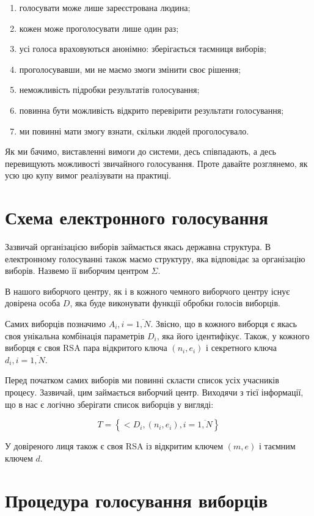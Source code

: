 \documentclass[12pt]{report}
\theoremstyle{plain}
\theoremstyle{definition}
\theoremstyle{remark}
\begin{document}
\begin{enumerate}
    \item голосувати може лише зареєстрована людина;
    \item кожен може проголосувати лише один раз;
    \item усі голоса враховуються анонімно: зберігається таємниця виборів;
    \item проголосувавши, ми не маємо змоги змінити своє рішення;
    \item неможливість підробки результатів голосування;
    \item повинна бути можливість відкрито перевірити результати голосування;
    \item ми повинні мати змогу взнати, скільки людей проголосувало.
\end{enumerate}

Як ми бачимо, виставленні вимоги до системи, десь співпадають, а десь перевищують можливості звичайного
голосування. Проте давайте розглянемо, як усю цю купу вимог реалізувати на практиці.

\section{Схема електронного голосування}

Зазвичай організацією виборів займається якась державна структура.
В електронному голосуванні також маємо структуру, яка відповідає за організацію 
виборів. Назвемо її виборчим центром $\Sigma$.

В нашого виборчого центру, як і в кожного чемного виборчого центру існує довірена
особа $D$, яка буде виконувати функції обробки голосів виборців.

Самих виборців позначимо $A_i, i=\overline{1,N}$. Звісно, що в кожного виборця є
якась своя унікальна комбінація параметрів $D_i$, яка його ідентифікує. 
Також, у кожного виборця є своя RSA пара відкритого ключа $(n_i,e_i)$ і 
секретного ключа $d_i, i=\overline{1,N}$.

Перед початком самих виборів ми повинні скласти список усіх учасників процесу.
Зазвичай, цим займається виборчий центр. Виходячи з тієї інформації, що в нас є
логічно зберігати список виборців у вигляді:

\[ T = \left \{ <D_i, (n_i,e_i), i = \overline{1,N} \right\} \]

У довіреного лиця також є своя RSA із відкритим ключем $(m,e)$ і таємним ключем $d$.

\section{Процедура голосування виборців}
\end{document}
